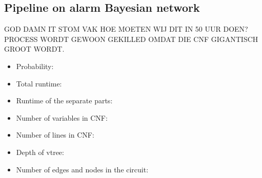 \subsection{Pipeline on alarm Bayesian network}
GOD DAMN IT STOM VAK HOE MOETEN WIJ DIT IN 50 UUR DOEN? PROCESS WORDT GEWOON GEKILLED OMDAT DIE CNF GIGANTISCH GROOT WORDT.
\begin{itemize}
    \item Probability:
    \item Total runtime:
    \item Runtime of the separate parts:
    \item Number of variables in CNF:
    \item Number of lines in CNF:
    \item Depth of vtree:
    \item Number of edges and nodes in the circuit:
\end{itemize}